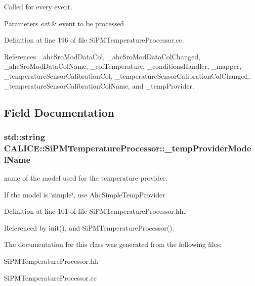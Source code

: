 Called for every event. 


\begin{DoxyParams}{Parameters}
{\em evt} & event to be processed \\
\hline
\end{DoxyParams}


Definition at line 196 of file Si\-P\-M\-Temperature\-Processor.\-cc.



References \-\_\-ahc\-Sro\-Mod\-Data\-Col, \-\_\-ahc\-Sro\-Mod\-Data\-Col\-Changed, \-\_\-ahc\-Sro\-Mod\-Data\-Col\-Name, \-\_\-col\-Temperature, \-\_\-conditions\-Handler, \-\_\-mapper, \-\_\-temperature\-Sensor\-Calibration\-Col, \-\_\-temperature\-Sensor\-Calibration\-Col\-Changed, \-\_\-temperature\-Sensor\-Calibration\-Col\-Name, and \-\_\-temp\-Provider.



\subsection{Field Documentation}
\subsubsection[{\-\_\-temp\-Provider\-Model\-Name}]{\setlength{\rightskip}{0pt plus 5cm}std\-::string C\-A\-L\-I\-C\-E\-::\-Si\-P\-M\-Temperature\-Processor\-::\-\_\-temp\-Provider\-Model\-Name\hspace{0.3cm}{\ttfamily [private]}}\label{classCALICE_1_1SiPMTemperatureProcessor_afdc26a29605485025b7f81dbc3c24aee}


name of the model used for the temperature provider. 

If the model is \char`\"{}simple\char`\"{}, use Ahc\-Simple\-Temp\-Provider 

Definition at line 101 of file Si\-P\-M\-Temperature\-Processor.\-hh.



Referenced by init(), and Si\-P\-M\-Temperature\-Processor().



The documentation for this class was generated from the following files\-:\begin{DoxyCompactItemize}
\item 
Si\-P\-M\-Temperature\-Processor.\-hh\item 
Si\-P\-M\-Temperature\-Processor.\-cc\end{DoxyCompactItemize}
